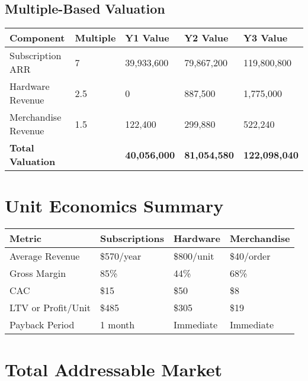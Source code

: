 \documentclass[11pt]{article}
\begin{document}
\subsection{Multiple-Based Valuation}
\begin{table}[htbp]
\centering
\begin{tabularx}{\linewidth}{l Y Y Y Y}
\toprule
Component & Multiple & Y1 Value & Y2 Value & Y3 Value \\\midrule
Subscription ARR & 7 & 39,933,600 & 79,867,200 & 119,800,800 \\
Hardware Revenue & 2.5 & 0 & 887,500 & 1,775,000 \\
Merchandise Revenue & 1.5 & 122,400 & 299,880 & 522,240 \\\midrule
\textbf{Total Valuation} &  & \textbf{40,056,000} & \textbf{81,054,580} & \textbf{122,098,040} \\
\bottomrule
\end{tabularx}
\end{table}

\section{Unit Economics Summary}

\begin{table}[htbp]
\centering
\begin{tabularx}{\linewidth}{l Y Y Y}
\toprule
Metric & Subscriptions & Hardware & Merchandise \\\midrule
Average Revenue & \$570/year & \$800/unit & \$40/order \\
Gross Margin & 85\% & 44\% & 68\% \\
CAC & \$15 & \$50 & \$8 \\
LTV or Profit/Unit & \$485 & \$305 & \$19 \\
Payback Period & 1 month & Immediate & Immediate \\
\bottomrule
\end{tabularx}
\end{table}

\section{Total Addressable Market}
\end{document}
